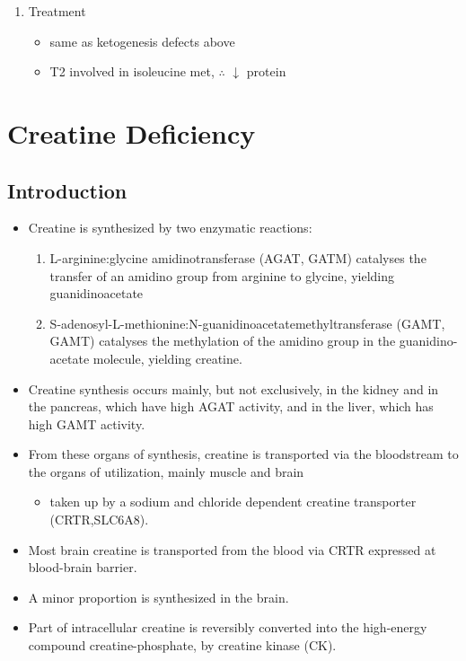 \documentclass{scrartcl}
\begin{document}
\begin{enumerate}
\item Treatment
\label{sec:org6b31b5c}
\begin{itemize}
\item same as ketogenesis defects above
\item T2 involved in isoleucine met, \(\therefore\) \(\downarrow\) protein
\end{itemize}
\end{enumerate}
\section{Creatine Deficiency}
\label{sec:org7057b8d}
\subsection{Introduction}
\label{sec:orgf04e59a}
\begin{itemize}
\item Creatine is synthesized by two enzymatic reactions:
\begin{enumerate}
\item L-arginine:glycine amidinotransferase (AGAT, GATM) catalyses the
transfer of an amidino group from arginine to glycine, yielding
guanidinoacetate
\item S-adenosyl-L-methionine:N-guanidinoacetatemethyltransferase
(GAMT, GAMT) catalyses the methylation of the amidino group in
the guanidino-acetate molecule, yielding creatine.
\end{enumerate}

\item Creatine synthesis occurs mainly, but not exclusively, in the kidney
and in the pancreas, which have high AGAT activity, and in the
liver, which has high GAMT activity.

\item From these organs of synthesis, creatine is transported via the
bloodstream to the organs of utilization, mainly muscle and brain
\begin{itemize}
\item taken up by a sodium and chloride dependent creatine transporter
(CRTR,SLC6A8).
\end{itemize}

\item Most brain creatine is transported from the blood via CRTR expressed
at blood-brain barrier.
\item A minor proportion is synthesized in the brain.

\item Part of intracellular creatine is reversibly converted into the
high-energy compound creatine-phosphate, by creatine kinase (CK).


\end{itemize}
\end{document}
